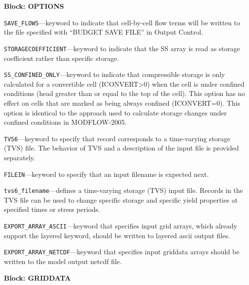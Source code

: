 
\item \textbf{Block: OPTIONS}

\begin{description}
\item \texttt{SAVE\_FLOWS}---keyword to indicate that cell-by-cell flow terms will be written to the file specified with ``BUDGET SAVE FILE'' in Output Control.

\item \texttt{STORAGECOEFFICIENT}---keyword to indicate that the SS array is read as storage coefficient rather than specific storage.

\item \texttt{SS\_CONFINED\_ONLY}---keyword to indicate that compressible storage is only calculated for a convertible cell (ICONVERT>0) when the cell is under confined conditions (head greater than or equal to the top of the cell). This option has no effect on cells that are marked as being always confined (ICONVERT=0).  This option is identical to the approach used to calculate storage changes under confined conditions in MODFLOW-2005.

\item \texttt{TVS6}---keyword to specify that record corresponds to a time-varying storage (TVS) file.  The behavior of TVS and a description of the input file is provided separately.

\item \texttt{FILEIN}---keyword to specify that an input filename is expected next.

\item \texttt{tvs6\_filename}---defines a time-varying storage (TVS) input file.  Records in the TVS file can be used to change specific storage and specific yield properties at specified times or stress periods.

\item \texttt{EXPORT\_ARRAY\_ASCII}---keyword that specifies input grid arrays, which already support the layered keyword, should be written to layered ascii output files.

\item \texttt{EXPORT\_ARRAY\_NETCDF}---keyword that specifies input griddata arrays should be written to the model output netcdf file.

\end{description}
\item \textbf{Block: GRIDDATA}

